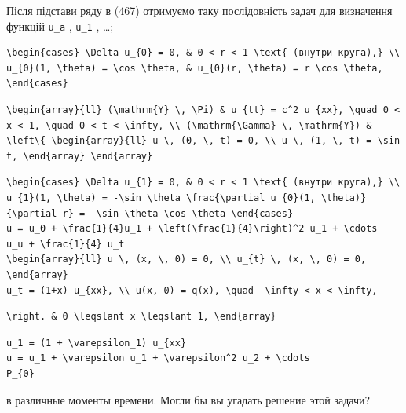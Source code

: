 \documentclass[
  ukrainian,
]{article}
\begin{document}
Після підстави ряду в (467) отримуємо таку послідовність задач для
визначення функцій \texttt{u\_a} , \texttt{u\_1} , \ldots;

\begin{verbatim}
\begin{cases} \Delta u_{0} = 0, & 0 < r < 1 \text{ (внутри круга),} \\ u_{0}(1, \theta) = \cos \theta, & u_{0}(r, \theta) = r \cos \theta, \end{cases}
\end{verbatim}

\begin{verbatim}
\begin{array}{ll} (\mathrm{Y} \, \Pi) & u_{tt} = c^2 u_{xx}, \quad 0 < x < 1, \quad 0 < t < \infty, \\ (\mathrm{\Gamma} \, \mathrm{Y}) & \left\{ \begin{array}{ll} u \, (0, \, t) = 0, \\ u \, (1, \, t) = \sin t, \end{array} \end{array}
\end{verbatim}

\begin{verbatim}
\begin{cases} \Delta u_{1} = 0, & 0 < r < 1 \text{ (внутри круга),} \\ u_{1}(1, \theta) = -\sin \theta \frac{\partial u_{0}(1, \theta)}{\partial r} = -\sin \theta \cos \theta \end{cases}
u = u_0 + \frac{1}{4}u_1 + \left(\frac{1}{4}\right)^2 u_1 + \cdots
u_u + \frac{1}{4} u_t
\begin{array}{ll} u \, (x, \, 0) = 0, \\ u_{t} \, (x, \, 0) = 0, \end{array}
u_t = (1+x) u_{xx}, \\ u(x, 0) = q(x), \quad -\infty < x < \infty,
\end{verbatim}

\begin{verbatim}
\right. & 0 \leqslant x \leqslant 1, \end{array}
\end{verbatim}

\begin{verbatim}
u_1 = (1 + \varepsilon_1) u_{xx}
u = u_1 + \varepsilon u_1 + \varepsilon^2 u_2 + \cdots
P_{0}
\end{verbatim}

в различные моменты времени. Могли бы вы угадать решение этой задачи?
\end{document}
